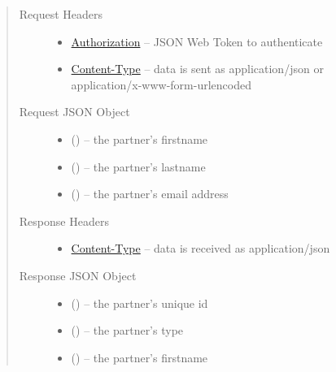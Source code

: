\documentclass[letterpaper,10pt,english]{sphinxmanual}
\begin{document}
\begin{fulllineitems}
\begin{quote}
\begin{description}
\begin{itemize}
\end{itemize}

\item[{Request Headers}] \leavevmode\begin{itemize}
\item {} 
\href{http://tools.ietf.org/html/rfc7235\#section-4.2}{Authorization} -- JSON Web Token to authenticate

\item {} 
\href{http://tools.ietf.org/html/rfc7231\#section-3.1.1.5}{Content-Type} -- data is sent as application/json or
application/x-www-form-urlencoded

\end{itemize}

\item[{Request JSON Object}] \leavevmode\begin{itemize}
\item {} 
 () -- the partner's firstname

\item {} 
 () -- the partner's lastname

\item {} 
 () -- the partner's email address

\end{itemize}

\item[{Response Headers}] \leavevmode\begin{itemize}
\item {} 
\href{http://tools.ietf.org/html/rfc7231\#section-3.1.1.5}{Content-Type} -- data is received as application/json

\end{itemize}

\item[{Response JSON Object}] \leavevmode\begin{itemize}
\item {} 
 () -- the partner's unique id

\item {} 
 () -- the partner's type

\item {} 
 () -- the partner's firstname


\end{itemize}
\end{description}
\end{quote}
\end{fulllineitems}
\end{document}
